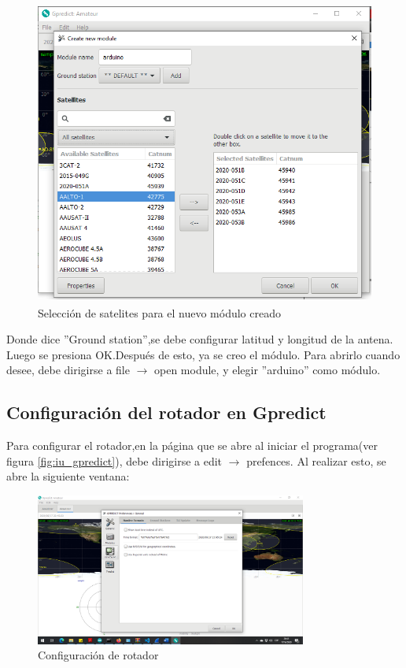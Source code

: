 \begin{figure}[ht]
	\centering
	\includegraphics[height=10cm,width=\textwidth]{select_sat}
	\caption{Selección de satelites para el nuevo módulo creado} 
	\label{fig:sel_sat}	
\end{figure}
Donde dice ''Ground station'',se debe configurar latitud y longitud de la antena. Luego se presiona OK.Después de esto, ya se creo el módulo. Para abrirlo cuando desee, debe dirigirse a file $\rightarrow$ open module, y elegir ''arduino'' como módulo.
\subsection{Configuración del rotador en Gpredict} \label{subs:conf_Gpredict}
Para configurar el rotador,en la página que se abre al iniciar el programa(ver figura	\ref{fig:iu_gpredict}), debe dirigirse a edit $\rightarrow$ prefences. Al realizar esto, se abre la siguiente ventana: 
\begin{figure}[H]
	\includegraphics[height=5cm,width=\textwidth]{select_rot}
	\caption{Configuración de rotador}
\end{figure} 

